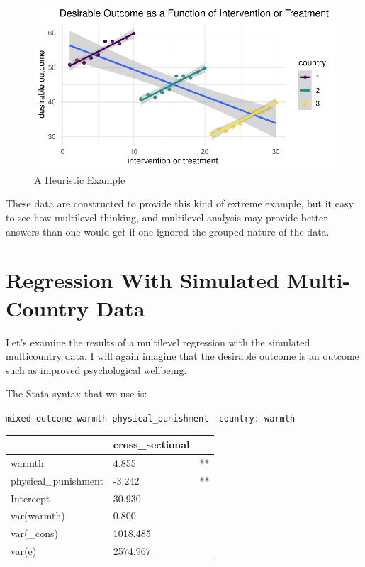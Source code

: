 \documentclass[
  letterpaper,
  DIV=11,
  numbers=noendperiod]{scrreprt}
\begin{document}
\begin{figure}[H]

{\centering \includegraphics{./cross-sectional_files/figure-pdf/unnamed-chunk-9-1.pdf}

}

\caption{A Heuristic Example}

\end{figure}

These data are constructed to provide this kind of extreme example, but
it easy to see how multilevel thinking, and multilevel analysis may
provide better answers than one would get if one ignored the grouped
nature of the data.

\hypertarget{sec-regression}{%
\section{Regression With Simulated Multi-Country
Data}\label{sec-regression}}

Let's examine the results of a multilevel regression with the simulated
multicountry data. I will again imagine that the desirable outcome is an
outcome such as improved psychological wellbeing.

The Stata syntax that we use is:

\texttt{mixed\ outcome\ warmth\ physical\_punishment\ \textbar{}\textbar{}\ country:\ warmth}

\begin{longtable}[]{@{}lll@{}}
\toprule()
& cross\_sectional & \\
\midrule()
\endhead
warmth & 4.855 & ** \\
physical\_punishment & -3.242 & ** \\
Intercept & 30.930 & \\
var(warmth) & 0.800 & \\
var(\_cons) & 1018.485 & \\
var(e) & 2574.967 & \\
\bottomrule()
\end{longtable}
\end{document}
